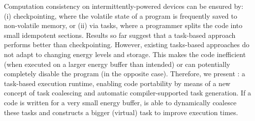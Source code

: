 Computation consistency on intermittently-powered devices  can be ensured by: (i) checkpointing, where the volatile state of a program is frequently saved to non-volatile memory, or (ii) via tasks, where a programmer splits the code into small idempotent sections. Results so far suggest that a task-based approach performs better than checkpointing. However, existing tasks-based approaches do not adapt to changing energy levels and storage. This makes the code inefficient (when executed on a larger energy buffer than intended) or can potentially completely disable the program (in the opposite case). Therefore, we present \sys: a task-based execution runtime, enabling code portability by means of a new concept of task coalescing and automatic compiler-supported task generation. If a code is written for a very small energy buffer, \sys is able to dynamically coalesce these tasks and constructs a bigger (virtual) task to improve execution times.
